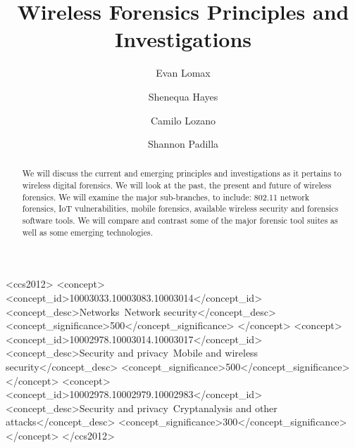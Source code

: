 \documentclass[acmlarge]{style/acmart}
\begin{document}
\title{Wireless Forensics Principles and Investigations}



\author{Evan Lomax}

\author{Shenequa Hayes}
\author{Camilo Lozano}
\author{Shannon Padilla}

\renewcommand{\shortauthors}{Lomax, et al.}

\begin{abstract}
We will discuss the current and emerging principles and investigations as it pertains to wireless digital forensics. We will look at the past, the present and future of wireless forensics. We will examine the major sub-branches, to include: 802.11 network forensics, IoT vulnerabilities, mobile forensics, available wireless security and forensics software tools. We will compare and contrast some of the major forensic tool suites as well as some emerging technologies.
\end{abstract}

\begin{CCSXML}
<ccs2012>
   <concept>
       <concept_id>10003033.10003083.10003014</concept_id>
       <concept_desc>Networks~Network security</concept_desc>
       <concept_significance>500</concept_significance>
       </concept>
   <concept>
       <concept_id>10002978.10003014.10003017</concept_id>
       <concept_desc>Security and privacy~Mobile and wireless security</concept_desc>
       <concept_significance>500</concept_significance>
       </concept>
   <concept>
       <concept_id>10002978.10002979.10002983</concept_id>
       <concept_desc>Security and privacy~Cryptanalysis and other attacks</concept_desc>
       <concept_significance>300</concept_significance>
       </concept>
 </ccs2012>
\end{CCSXML}

\end{document}
